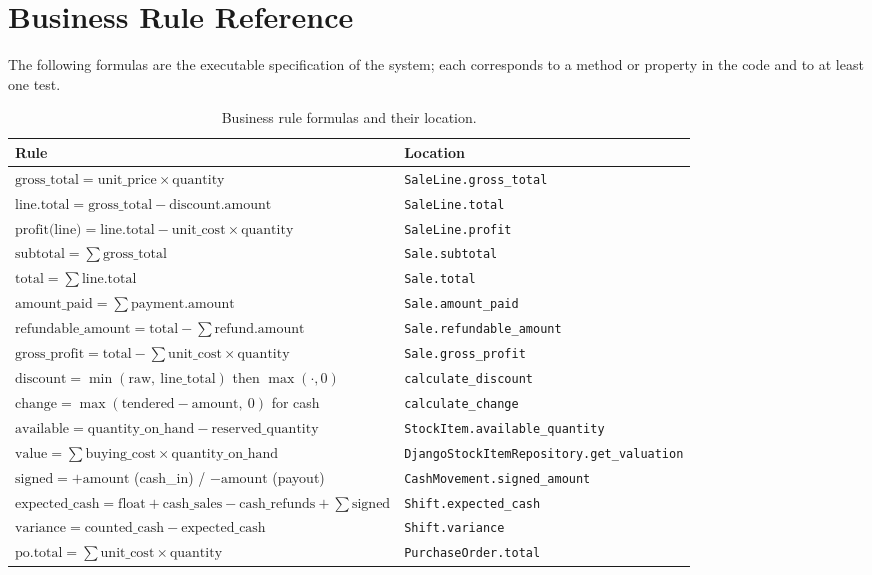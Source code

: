 \documentclass[11pt,a4paper]{article}
\begin{document}
\section{Business Rule Reference}
\label{app:rules}

The following formulas are the executable specification of the system; each corresponds to a method
or property in the code and to at least one test.

\begin{table}[htbp]\centering
\small
\caption{Business rule formulas and their location.}
\begin{tabular}{@{}p{}p{}@{}}
\toprule
\textbf{Rule} & \textbf{Location} \\
\midrule
$\text{gross\_total} = \text{unit\_price} \times \text{quantity}$ & \texttt{SaleLine.gross\_total} \\
$\text{line.total} = \text{gross\_total} - \text{discount.amount}$ & \texttt{SaleLine.total} \\
$\text{profit(line)} = \text{line.total} - \text{unit\_cost} \times \text{quantity}$ &
\texttt{SaleLine.profit} \\
$\text{subtotal} = \sum \text{gross\_total}$ & \texttt{Sale.subtotal} \\
$\text{total} = \sum \text{line.total}$ & \texttt{Sale.total} \\
$\text{amount\_paid} = \sum \text{payment.amount}$ & \texttt{Sale.amount\_paid} \\
$\text{refundable\_amount} = \text{total} - \sum \text{refund.amount}$ &
\texttt{Sale.refundable\_amount} \\
$\text{gross\_profit} = \text{total} - \sum \text{unit\_cost} \times \text{quantity}$ &
\texttt{Sale.gross\_profit} \\
$\text{discount} = \min(\text{raw},\ \text{line\_total})$ then $\max(\cdot, 0)$ &
\texttt{calculate\_discount} \\
$\text{change} = \max(\text{tendered} - \text{amount},\ 0)$ for cash & \texttt{calculate\_change} \\
$\text{available} = \text{quantity\_on\_hand} - \text{reserved\_quantity}$ &
\texttt{StockItem.available\_quantity} \\
$\text{value} = \sum \text{buying\_cost} \times \text{quantity\_on\_hand}$ &
\texttt{DjangoStockItemRepository.get\_valuation} \\
$\text{signed} = +\text{amount}$ (cash\_in) / $-\text{amount}$ (payout) &
\texttt{CashMovement.signed\_amount} \\
$\text{expected\_cash} = \text{float} + \text{cash\_sales} - \text{cash\_refunds} + \sum \text{signed}$ &
\texttt{Shift.expected\_cash} \\
$\text{variance} = \text{counted\_cash} - \text{expected\_cash}$ & \texttt{Shift.variance} \\
$\text{po.total} = \sum \text{unit\_cost} \times \text{quantity}$ & \texttt{PurchaseOrder.total} \\
\bottomrule
\end{tabular}
\end{table}
\end{document}
